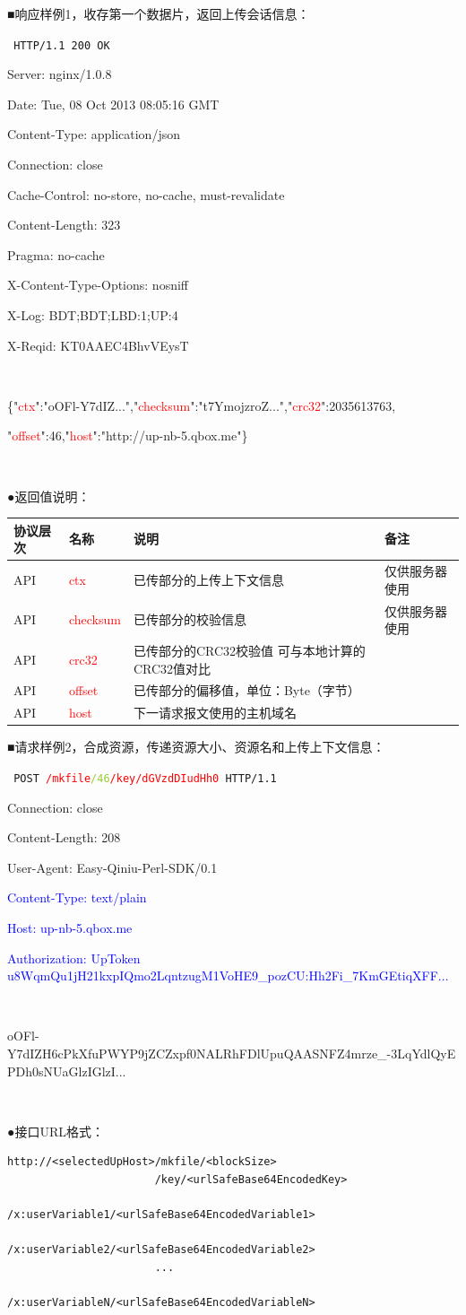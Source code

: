 \documentclass[11pt, oneside]{book}
\newcommand{\qblock}[1]{
\vspace{0.1em}
\noindent
#1\par
\vspace{0.1em}
}
\newcommand{\qtable}[1]{\footnotesize\vspace{0.5em}#1\vspace{0.5em}\normalsize}
\newcommand{\qhttp}[1]{\noindent #1\par}
\begin{document}
\clearpage

\qblock{■\thinspace 响应样例1，收存第一个数据片，返回上传会话信息：}
{
\tt \footnotesize
\qhttp{HTTP/1.1 200 OK}
\qhttp{Server: nginx/1.0.8}
\qhttp{Date: Tue, 08 Oct 2013 08:05:16 GMT}
\qhttp{Content-Type: application/json}
\qhttp{Connection: close}
\qhttp{Cache-Control: no-store, no-cache, must-revalidate}
\qhttp{Content-Length: 323}
\qhttp{Pragma: no-cache}
\qhttp{X-Content-Type-Options: nosniff}
\qhttp{X-Log: BDT;BDT;LBD:1;UP:4}
\qhttp{X-Reqid: KT0AAEC4BhvVEysT}
\qhttp{\ }
\qhttp{\{"\textcolor{red}{ctx}":"oOFl-Y7dIZ...","\textcolor{red}{checksum}":"t7YmojzroZ...","\textcolor{red}{crc32}":2035613763,}
\qhttp{"\textcolor{red}{offset}":46,"\textcolor{red}{host}":"http://up-nb-5.qbox.me"\}}
\qhttp{\ }
}

\qblock{●\thinspace 返回值说明：}
\qtable{
\def\arraystretch{2}
\begin{tabular}{|l|p{7em}|p{19em}|p{7em}|}
\hline
协议层次 & 名称 & 说明 & 备注 \\
\hline
API & \textcolor{red}{ctx} & 已传部分的上传上下文信息 & 仅供服务器使用 \\
\hline
API & \textcolor{red}{checksum} & 已传部分的校验信息 & 仅供服务器使用 \\
\hline
API & \textcolor{red}{crc32} & 已传部分的CRC32校验值 \newline 可与本地计算的CRC32值对比 & \\
\hline
API & \textcolor{red}{offset} & 已传部分的偏移值，单位：Byte（字节） & \\
\hline
API & \textcolor{red}{host} & 下一请求报文使用的主机域名 & \\
\hline
\end{tabular}
}

\clearpage

\qblock{■\thinspace 请求样例2，合成资源，传递资源大小、资源名和上传上下文信息：}
{
\tt \footnotesize
\qhttp{POST \textcolor{red}{/mkfile}\textcolor{YellowGreen}{/46}\textcolor{red}{/key/dGVzdDIudHh0} HTTP/1.1}
\qhttp{Connection: close}
\qhttp{Content-Length: 208}
\qhttp{User-Agent: Easy-Qiniu-Perl-SDK/0.1}
\qhttp{\textcolor{blue}{Content-Type: text/plain}}
\qhttp{\textcolor{blue}{Host: up-nb-5.qbox.me}}
\qhttp{\textcolor{blue}{Authorization: UpToken u8WqmQu1jH21kxpIQmo2LqntzugM1VoHE9\_pozCU:Hh2Fi\_7KmGEtiqXFF...}}
\qhttp{\ }
\qhttp{\textcolor{YellowOrange}{oOFl-Y7dIZH6cPkXfuPWYP9jZCZxpf0NALRhFDlUpuQAASNFZ4mrze\_-3LqYdlQyEPDh0sNUaGlzIGlzI...}}
\qhttp{\ }
}

\qblock{●\thinspace 接口URL格式：}
\begin{lstlisting}
http://<selectedUpHost>/mkfile/<blockSize>
                       /key/<urlSafeBase64EncodedKey>
                       /x:userVariable1/<urlSafeBase64EncodedVariable1>
                       /x:userVariable2/<urlSafeBase64EncodedVariable2>
                       ...
                       /x:userVariableN/<urlSafeBase64EncodedVariableN>
\end{lstlisting}
\end{document}
